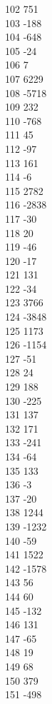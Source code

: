 { 102	751 \\
 103	-188 \\
 104	-648 \\
 105	-24 \\
 106	7 \\
 107	6229 \\
 108	-5718 \\
 109	232 \\
 110	-768 \\
 111	45 \\
 112	-97 \\
 113	161 \\
 114	-6 \\
 115	2782 \\
 116	-2838 \\
 117	-30 \\
 118	20 \\
 119	-46 \\
 120	-17 \\
 121	131 \\
 122	-34 \\
 123	3766 \\
 124	-3848 \\
 125	1173 \\
 126	-1154 \\
 127	-51 \\
 128	24 \\
 129	188 \\
 130	-225 \\
 131	137 \\
 132	171 \\
 133	-241 \\
 134	-64 \\
 135	133 \\
 136	-3 \\
 137	-20 \\
 138	1244 \\
 139	-1232 \\
 140	-59 \\
 141	1522 \\
 142	-1578 \\
 143	56 \\
 144	60 \\
 145	-132 \\
 146	131 \\
 147	-65 \\
 148	19 \\
 149	68 \\
 150	379 \\
 151	-498 \\
}
